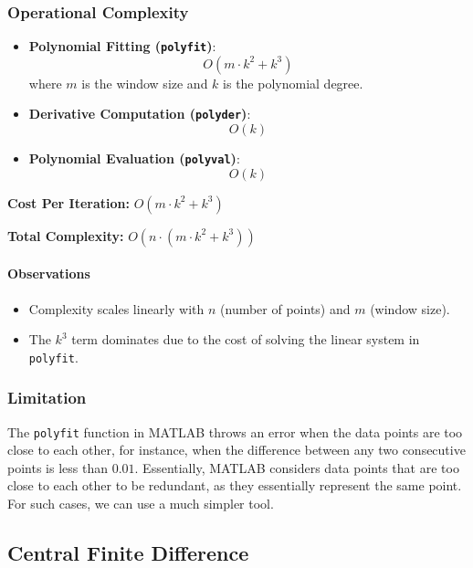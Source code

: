 \documentclass[a4paper]{article}
\begin{document}
\subsubsection*{Operational Complexity}
\begin{itemize}
    \item \textbf{Polynomial Fitting (\texttt{polyfit})}: 
    \[
    O(m \cdot k^2 + k^3)
    \]
    where \( m \) is the window size and \( k \) is the polynomial degree.
    \item \textbf{Derivative Computation (\texttt{polyder})}:
    \[
    O(k)
    \]
    \item \textbf{Polynomial Evaluation (\texttt{polyval})}:
    \[
    O(k)
    \]
\end{itemize}

\textbf{Cost Per Iteration:} \(O(m \cdot k^2 + k^3)\)

\textbf{Total Complexity:} \(O(n \cdot (m \cdot k^2 + k^3))\)

\paragraph*{Observations}
\begin{itemize}
    \item Complexity scales linearly with \( n \) (number of points) and \( m \) (window size).
    \item The \( k^3 \) term dominates due to the cost of solving the linear system in \texttt{polyfit}.
\end{itemize}

\subsubsection{Limitation}
The \verb|polyfit| function in MATLAB throws an error when the data points are too close to each other, for instance, when the difference between any two consecutive points is less than \(0.01\). Essentially, MATLAB considers data points that are too close to each other to be redundant, as they essentially represent the same point. For such cases, we can use a much simpler tool.

\hypertarget{Central Finite Difference}{%
\subsection{Central Finite Difference}\label{lagranges-mean-value-theorem}}
\end{document}

